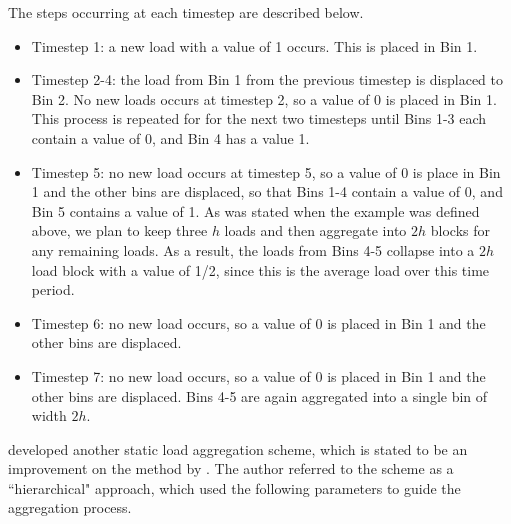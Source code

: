 \documentclass[review,12pt]{elsarticle}
\begin{document}
The steps occurring at each timestep are described below.

\begin{itemize}
    \item Timestep 1: a new load with a value of 1 occurs. This is placed in Bin 1.
    
    \item Timestep 2-4: the load from Bin 1 from the previous timestep is displaced to Bin 2. No new loads occurs at timestep 2, so a value of 0 is placed in Bin 1. This process is repeated for for the next two timesteps until Bins 1-3 each contain a value of 0, and Bin 4 has a value 1.
    
    \item Timestep 5: no new load occurs at timestep 5, so a value of 0 is place in Bin 1 and the other bins are displaced, so that Bins 1-4 contain a value of 0, and Bin 5 contains a value of 1. As was stated when the example was defined above, we plan to keep three $h$ loads and then aggregate into $2h$ blocks for any remaining loads. As a result, the loads from Bins 4-5 collapse into a $2h$ load block with a value of 1/2, since this is the average load over this time period.
    
    \item Timestep 6: no new load occurs, so a value of 0 is placed in Bin 1 and the other bins are displaced.
    
    \item Timestep 7: no new load occurs, so a value of 0 is placed in Bin 1 and the other bins are displaced. Bins 4-5 are again aggregated into a single bin of width $2h$.
    
\end{itemize}

\cite{Liu2005} developed another static load aggregation scheme, which is stated to be an improvement on the method by \cite{YavuzturkSpitler1999}. The author referred to the scheme as a ``hierarchical" approach, which used the following parameters to guide the aggregation process.
\end{document}
